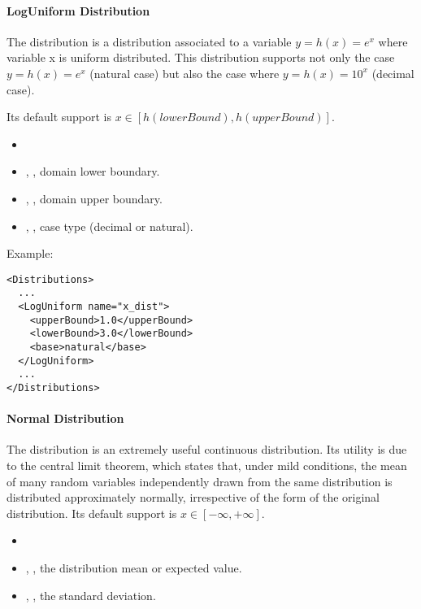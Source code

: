 \paragraph{LogUniform Distribution}
\label{LogNormal}
The  distribution is a distribution associated to
a variable $y=h(x)=e^{x}$ where variable x is uniform distributed.
This distribution supports not only the case  $y=h(x)=e^{x}$ (natural case) but also
the case where $y=h(x)=10^{x}$ (decimal case).
%

Its default support is $x \in [h(lowerBound),h(upperBound)]$.

%
\attrIntro
\vspace{-5mm}
\begin{itemize}
  \itemsep0em
  \item \nameDescription
\end{itemize}
\vspace{-5mm}
\subnodesIntro
\begin{itemize}
  \item {}, , domain lower boundary.
  \item {}, , domain upper boundary.
  \item {}, , case type (decimal or natural).
\end{itemize}

Example:
\begin{lstlisting}[style=XML]
<Distributions>
  ...
  <LogUniform name="x_dist">
    <upperBound>1.0</upperBound>
    <lowerBound>3.0</lowerBound>
    <base>natural</base>
  </LogUniform>
  ...
</Distributions>
\end{lstlisting}

\paragraph{Normal Distribution}
\label{Normal}
The  distribution is an extremely
useful continuous distribution.
%
Its utility is due to the central limit theorem, which states that, under mild
conditions, the mean of many random variables independently drawn from the same
distribution is distributed approximately normally, irrespective of the form of
the original distribution.
%
Its default support is $x \in [-\infty, +\infty]$.

%
\attrIntro
\vspace{-5mm}
\begin{itemize}
  \itemsep0em
  \item \nameDescription
\end{itemize}
\vspace{-5mm}
\subnodesIntro
\begin{itemize}
  \item {}, , the distribution
  mean
  or expected value.
  \item {}, , the standard
  deviation.
\end{itemize}


